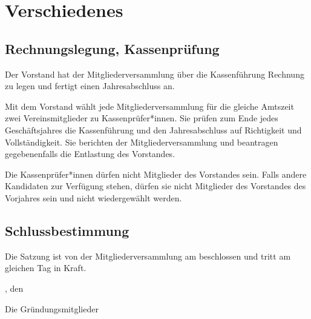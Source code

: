 \chapter{Verschiedenes}

\section{Rechnungslegung, Kassenprüfung}
\begin{absätze}
	\item Der Vorstand hat der Mitgliederversammlung über die Kassenführung Rechnung zu legen und fertigt einen Jahresabschluss an.
	\item Mit dem Vorstand wählt jede Mitgliederversammlung für die gleiche Amtszeit zwei Vereinsmitglieder zu Kassenprüfer*innen. Sie prüfen zum Ende jedes Geschäftsjahres die Kassenführung und den Jahresabschluss auf Richtigkeit und Vollständigkeit. Sie berichten der Mitgliederversammlung und beantragen gegebenenfalls die Entlastung des Vorstandes.
	\item Die Kassenprüfer*innen dürfen nicht Mitglieder des Vorstandes sein. Falls andere Kandidaten zur Verfügung stehen, dürfen sie nicht Mitglieder des Vorstandes des Vorjahres sein und nicht wiedergewählt werden.
\end{absätze}

\section{Schlussbestimmung}
Die Satzung ist von der Mitgliederversammlung am \DatumSatzung{} beschlossen und tritt am gleichen Tag in Kraft.

\vfill %

\Stadt{}, den \DatumSatzung{}

Die Gründungsmitglieder
